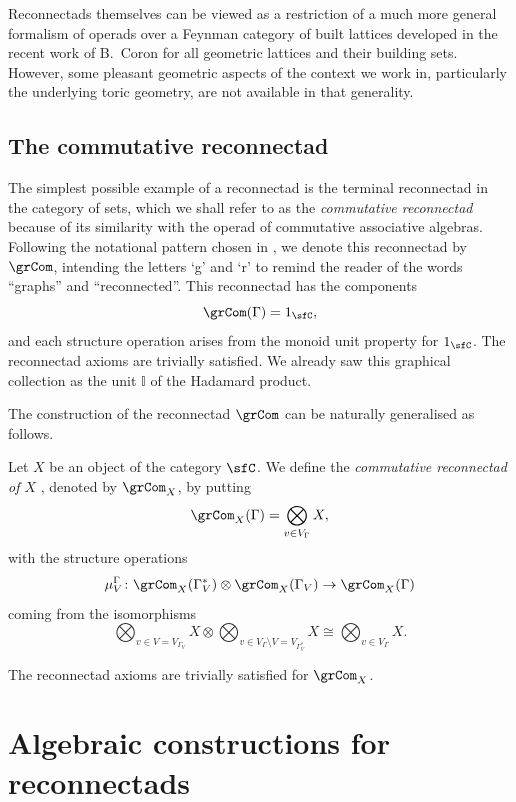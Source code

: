 \begin{rema}
Reconnectads themselves can be viewed as a restriction of a much more general formalism of operads over a Feynman category of built lattices developed in the recent work of B.~Coron \cite{CoronLattices} for all geometric lattices and their building sets. However, some pleasant geometric aspects of the context we work in, particularly the underlying toric geometry, are not available in that generality. 
\end{rema}

\subsection{The commutative reconnectad}

The simplest possible example of a reconnectad is the terminal reconnectad in the category of sets, which we shall refer to as the \emph{commutative reconnectad} because of its similarity with the operad of commutative associative algebras. Following the notational pattern chosen in \cite{DSVV}, we denote this reconnectad by $\grCom$, intending the letters `g' and `r' to remind the reader of the words ``graphs'' and ``reconnected''. This reconnectad has the components 
 \[
\grCom(\Gamma)=1_{\sfC}, 
 \]
and each structure operation arises from the monoid unit property for $1_{\sfC}$. The reconnectad axioms are trivially satisfied. We already saw this graphical collection as the unit $\mathbb{I}$ of the Hadamard product.

The construction of the reconnectad $\grCom$ can be naturally generalised as follows.

\begin{defi}
Let $X$ be an object of the category $\sfC$. We define the \emph{commutative reconnectad of $X$} , denoted by $\grCom_X$, by putting 
 \[
\grCom_X(\Gamma)=\bigotimes_{v\in V_\Gamma} X, 
 \]
with the structure operations   
 \[
\mu^\Gamma_V\colon\grCom_X(\Gamma^*_V)\otimes\grCom_X(\Gamma_V)\to\grCom_X(\Gamma)
 \]
coming from the isomorphisms 
 \[
\bigotimes_{v\in V=V_{\Gamma_V}} X\otimes \bigotimes_{v\in V_\Gamma\setminus V=V_{\Gamma^*_V}} X\cong \bigotimes_{v\in V_\Gamma} X.
 \]
\end{defi}
The reconnectad axioms are trivially satisfied for $\grCom_X$. 

\section{Algebraic constructions for reconnectads}\label{sec:algebra-reconnectads}

